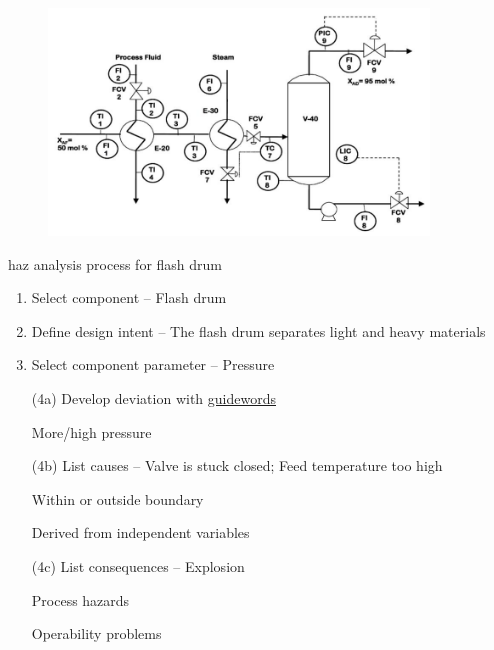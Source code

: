 \documentclass[aspectratio=1610,pdftex,dvipsnames,compress,xcolor={dvipsnames}]{beamer}
\newcommand{\acs}{\acrshort} %
\begin{document}
\addtocounter{framenumber}{-1}
\begin{frame}{}
    \begin{figure}
        \centering
        \href{https://uidaho.pressbooks.pub/riskassessment/chapter/hazop/}{\includegraphics[width=0.90\textwidth]{hazop_flash.drum.jpg}}
    \end{figure}
\end{frame}


\begin{frame}{\acs{haz} analysis process for flash drum}
    \begin{enumerate}[series=outerlist,topsep=0pt,itemsep=1pt,leftmargin=*,label=(\arabic*)]
        \item Select component -- Flash drum
            \vspace{0.07in}
        \item Define design intent -- The flash drum separates light and heavy materials
            \vspace{0.07in}
        \item Select component parameter -- Pressure
            \vspace{0.07in}
        \item[(4a)] Develop deviation with \href{https://uidaho.pressbooks.pub/riskassessment/chapter/hazop/}{guidewords}
        \item[]More/high pressure
            \vspace{0.07in}
        \item[(4b)] List causes -- Valve is stuck closed; Feed temperature too high 
        \item[]Within or outside boundary  
        \item[]Derived from independent variables
            \vspace{0.07in}
        \item[(4c)] List consequences -- Explosion  
        \item[] Process hazards  
        \item[] Operability problems 
    \end{enumerate}
\end{frame}
\end{document}
